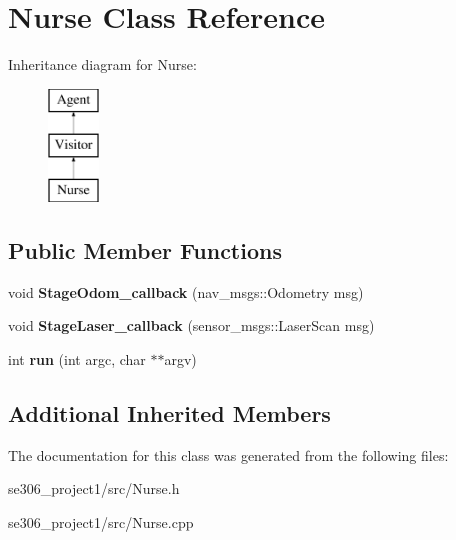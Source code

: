 \hypertarget{classNurse}{\section{Nurse Class Reference}
\label{classNurse}
}
Inheritance diagram for Nurse\-:\begin{figure}[H]
\begin{center}
\leavevmode
\includegraphics[height=3.000000cm]{classNurse}
\end{center}
\end{figure}
\subsection*{Public Member Functions}
\begin{DoxyCompactItemize}
\item 
\hypertarget{classNurse_a3ff47edb35f171a538fe62b3abdca948}{void {\bfseries Stage\-Odom\-\_\-callback} (nav\-\_\-msgs\-::\-Odometry msg)}\label{classNurse_a3ff47edb35f171a538fe62b3abdca948}

\item 
\hypertarget{classNurse_aa709fbc5dc09b8db82db59c1a2829d4a}{void {\bfseries Stage\-Laser\-\_\-callback} (sensor\-\_\-msgs\-::\-Laser\-Scan msg)}\label{classNurse_aa709fbc5dc09b8db82db59c1a2829d4a}

\item 
\hypertarget{classNurse_a73f9edde8df4beb33b9810034faead0c}{int {\bfseries run} (int argc, char $\ast$$\ast$argv)}\label{classNurse_a73f9edde8df4beb33b9810034faead0c}

\end{DoxyCompactItemize}
\subsection*{Additional Inherited Members}


The documentation for this class was generated from the following files\-:\begin{DoxyCompactItemize}
\item 
se306\-\_\-project1/src/Nurse.\-h\item 
se306\-\_\-project1/src/Nurse.\-cpp\end{DoxyCompactItemize}
